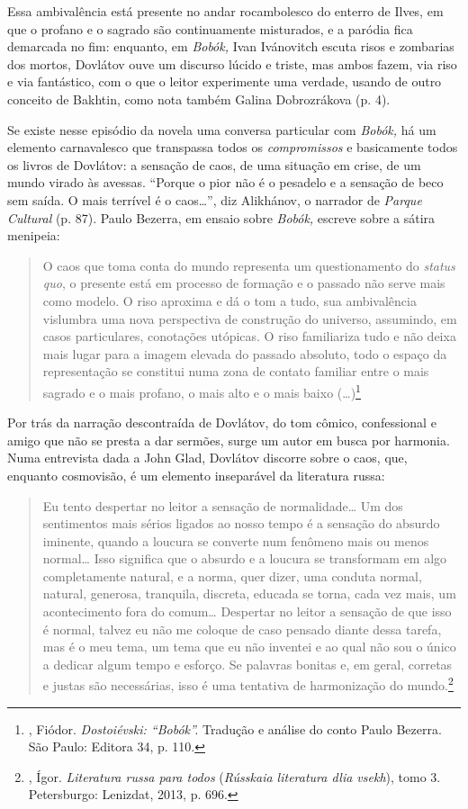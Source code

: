 Essa ambivalência está presente no andar rocambolesco do enterro de
Ilves, em que o profano e o sagrado são continuamente misturados, e a
paródia fica demarcada no fim: enquanto, em \emph{Bobók,} Ivan
Ivánovitch escuta risos e zombarias dos mortos, Dovlátov ouve um
discurso lúcido e triste, mas ambos fazem, via riso e via fantástico,
com o que o leitor experimente uma verdade, usando de outro conceito de
Bakhtin, como nota também Galina Dobrozrákova (p. 4).

Se existe nesse episódio da novela uma conversa particular com
\emph{Bobók,} há um elemento carnavalesco que transpassa todos os
\emph{compromissos} e basicamente todos os livros de Dovlátov: a
sensação de caos, de uma situação em crise, de um mundo virado às
avessas. ``Porque o pior não
é o pesadelo e a sensação de beco sem saída. O mais terrível é o
caos\ldots{}'', diz Alikhánov, o narrador de \emph{Parque Cultural} (p. 87).
Paulo Bezerra, em ensaio sobre \emph{Bobók,} escreve sobre a sátira
menipeia:

\begin{quotation}
O caos que toma conta do mundo representa um questionamento do
\emph{status quo}, o presente está em processo de formação e o passado
não serve mais como modelo. O riso aproxima e dá o tom a tudo, sua
ambivalência vislumbra uma nova perspectiva de construção do universo,
assumindo, em casos particulares, conotações utópicas. O riso
familiariza tudo e não deixa mais lugar para a imagem elevada do passado
absoluto, todo o espaço da representação se constitui numa zona de
contato familiar entre o mais sagrado e o mais profano, o mais alto e o
mais baixo (\ldots{})\footnote{, Fiódor. \emph{Dostoiévski:
  ``Bobók''.} Tradução e análise do conto Paulo Bezerra. São Paulo:
  Editora 34, p. 110.}
\end{quotation}

Por trás da narração descontraída de Dovlátov, do tom cômico,
confessional e amigo que não se presta a dar sermões, surge um autor em
busca por harmonia. Numa entrevista dada a John Glad, Dovlátov discorre
sobre o caos, que, enquanto cosmovisão, é um elemento inseparável da
literatura russa:

\begin{quotation}
Eu tento despertar no leitor a sensação de normalidade\ldots{} Um dos
sentimentos mais sérios ligados ao nosso tempo é a sensação do absurdo
iminente, quando a loucura se converte num fenômeno mais ou menos
normal\ldots{} Isso significa que o absurdo e a loucura se transformam em
algo completamente natural, e a norma, quer dizer, uma conduta normal,
natural, generosa, tranquila, discreta, educada se torna, cada vez mais,
um acontecimento fora do comum\ldots{} Despertar no leitor a sensação de que
isso é normal, talvez eu não me coloque de caso pensado diante dessa
tarefa, mas é o meu tema, um tema que eu não inventei e ao qual não sou
o único a dedicar algum tempo e esforço. Se palavras bonitas e, em
geral, corretas e justas são necessárias, isso é uma tentativa de
harmonização do mundo.\footnote{, Ígor. \emph{Literatura russa
  para todos} (\emph{Rússkaia literatura dlia vsekh}), tomo 3.
  Petersburgo: Lenizdat, 2013, p. 696.}
\end{quotation}

